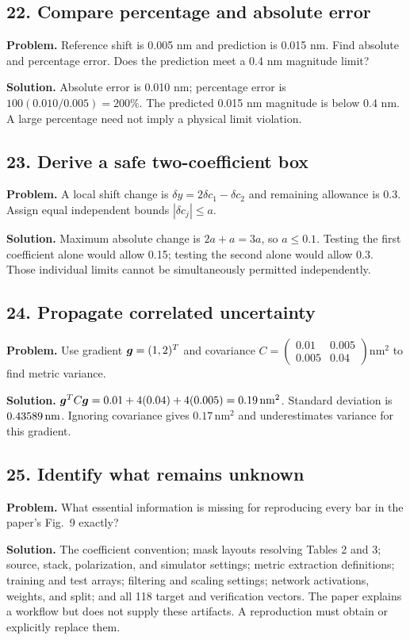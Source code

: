 \subsection*{22. Compare percentage and absolute error}
\textbf{Problem.} Reference shift is 0.005 nm and prediction is 0.015 nm.
Find absolute and percentage error. Does the prediction meet a 0.4 nm
magnitude limit?

\textbf{Solution.}
Absolute error is 0.010 nm; percentage error is
$100(0.010/0.005)=200\%$.
The predicted 0.015 nm magnitude is below 0.4 nm.
A large percentage need not imply a physical limit violation.

\subsection*{23. Derive a safe two-coefficient box}
\textbf{Problem.} A local shift change is
$\delta y=2\delta c_1-\delta c_2$ and remaining allowance is 0.3.
Assign equal independent bounds $|\delta c_j|\leq a$.

\textbf{Solution.}
Maximum absolute change is $2a+a=3a$, so $a\leq0.1$.
Testing the first coefficient alone would allow 0.15; testing the
second alone would allow 0.3. Those individual limits cannot be
simultaneously permitted independently.

\subsection*{24. Propagate correlated uncertainty}
\textbf{Problem.} Use gradient $\bm{g}=(1,2)^T$ and covariance
$C=\begin{pmatrix}0.01&0.005\\0.005&0.04\end{pmatrix}\mathrm{nm}^2$
to find metric variance.

\textbf{Solution.}
$\bm{g}^TC\bm{g}=0.01+4(0.04)+4(0.005)=0.19\,\mathrm{nm}^2$.
Standard deviation is $0.43589\,\mathrm{nm}$.
Ignoring covariance gives $0.17\,\mathrm{nm}^2$ and underestimates
variance for this gradient.

\subsection*{25. Identify what remains unknown}
\textbf{Problem.} What essential information is missing for reproducing
every bar in the paper's Fig.~9 exactly?

\textbf{Solution.}
The coefficient convention; mask layouts resolving Tables 2 and 3;
source, stack, polarization, and simulator settings; metric extraction
definitions; training and test arrays; filtering and scaling settings;
network activations, weights, and split; and all 118 target and
verification vectors. The paper explains a workflow but does not
supply these artifacts. A reproduction must obtain or explicitly replace them.

